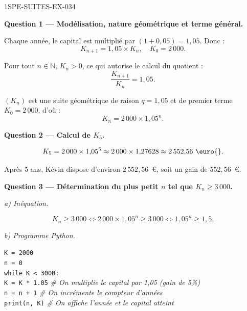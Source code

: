\begin{corrige}{1SPE-SUITES-EX-034}

\textbf{Question 1 — Modélisation, nature géométrique et terme général.}

Chaque année, le capital est multiplié par $(1 + 0{,}05) = 1{,}05$. Donc :
\[
  K_{n+1} = 1{,}05 \times K_n, \quad K_0 = 2\,000.
\]

Pour tout $n \in \mathbb{N}$, $K_n > 0$, ce qui autorise le calcul du quotient :
\[
  \frac{K_{n+1}}{K_n} = 1{,}05.
\]


$(K_n)$ est une suite géométrique de raison $q = 1{,}05$ et de premier terme $K_0 = 2\,000$, d'où :
\[
  K_n = 2\,000 \times 1{,}05^n.
\]

\medskip
\textbf{Question 2 — Calcul de $K_5$.}

\[
  K_5 = 2\,000 \times 1{,}05^5 \approx 2\,000 \times 1{,}27628 \approx 2\,552{,}56 \text{ \euro{}}.
\]

Après $5$ ans, Kévin dispose d'environ $2\,552{,}56$~\euro{}, soit un gain de $552{,}56$~\euro{}.

\medskip
\textbf{Question 3 — Détermination du plus petit $n$ tel que $K_n \geq 3\,000$.}

\textit{a) Inéquation.}

\[
  K_n \geq 3\,000 \iff 2\,000 \times 1{,}05^n \geq 3\,000 \iff 1{,}05^n \geq 1{,}5.
\]

\textit{b) Programme Python.}

\medskip
\texttt{K = 2000}\\
\texttt{n = 0}\\
\texttt{while K < 3000:}\\
\hspace*{1.5em}\texttt{K = K * 1.05} \quad \textit{\# On multiplie le capital par 1,05 (gain de 5\%)}\\
\hspace*{1.5em}\texttt{n = n + 1} \quad \textit{\# On incrémente le compteur d'années}\\
\texttt{print(n, K)} \quad \textit{\# On affiche l'année et le capital atteint}


\end{corrige}
